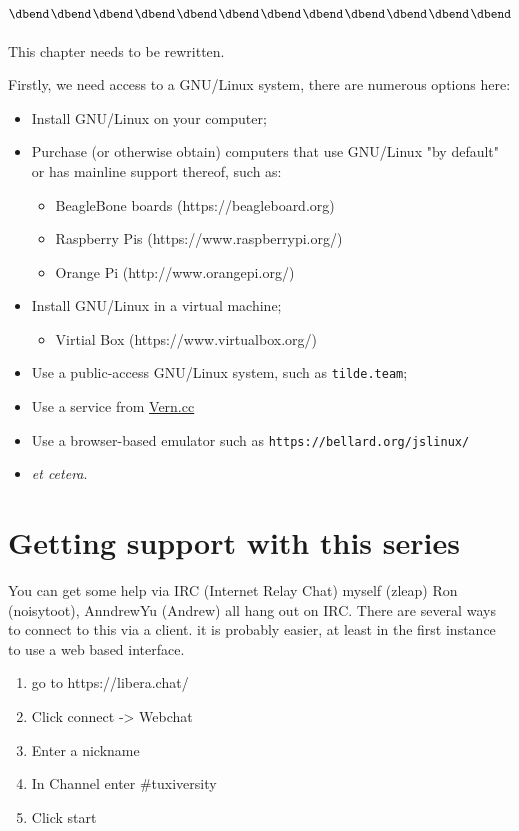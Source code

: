 \documentclass{extbook}
\begin{document}
$$\vcenter{\hbox{\dbend\kern1pt\dbend\kern1pt\dbend\kern1pt\dbend\kern1pt\dbend\kern1pt\dbend\kern1pt\dbend\kern1pt\dbend\kern1pt\dbend\kern1pt\dbend\kern1pt\dbend\kern1pt\dbend}\vskip 11pt}$$
This chapter needs to be rewritten.

Firstly, we need access to a GNU/Linux system, there are numerous options here:

\begin{itemize}
    \item Install GNU/Linux on your computer;
    \item Purchase (or otherwise obtain) computers that use GNU/Linux "by default" or has mainline support thereof, such as:
    \begin{itemize}
        \item BeagleBone boards (https://beagleboard.org)
        \item Raspberry Pis (https://www.raspberrypi.org/)
        \item Orange Pi (http://www.orangepi.org/)
    \end{itemize}
    \item Install GNU/Linux in a virtual machine;
    \begin{itemize}
        \item Virtial Box (https://www.virtualbox.org/)
    \end{itemize}
    \item Use a public-access GNU/Linux system, such as \texttt{tilde.team};
    \item Use a service from \href{https:\\www.vern.cc}{Vern.cc}
    \item Use a browser-based emulator such as \texttt{https://bellard.org/jslinux/}
    \item \textit{et cetera}.
    \end{itemize}

\chapter{Getting support with this series}

You can get some help via IRC (Internet Relay Chat) myself (zleap) Ron (noisytoot), AnndrewYu (Andrew) all hang out on IRC.  There are several ways to connect to this via a client. it is probably easier, at least in the first instance to use a web based interface. 

\begin{enumerate}
\item go to https://libera.chat/
\item Click connect -> Webchat
\item Enter a nickname
\item In Channel enter \#tuxiversity
\item Click start
\end{enumerate}
\end{document}
